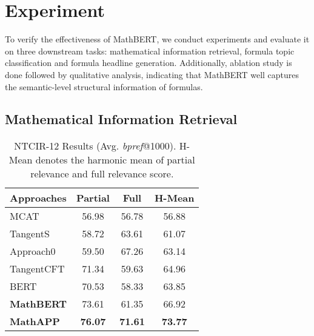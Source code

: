 \documentclass{article}
\begin{document}
\section{Experiment}

To verify the effectiveness of MathBERT, we conduct experiments and evaluate it on three downstream tasks: mathematical information retrieval, formula topic classification and formula headline generation. Additionally, ablation study is done followed by qualitative analysis, indicating that MathBERT well captures the semantic-level structural information of formulas.

\subsection{Mathematical Information Retrieval}\label{subsection:MIR}

\begin{table}[!h]
\vskip -0.05in
\centering
\begin{tabular}{lccc}
\toprule
Approaches         & Partial & Full & H-Mean \\
\hline
MCAT         & 56.98             & 56.78         & 56.88        \\
TangentS     & 58.72             & 63.61         & 61.07        \\
Approach0    & 59.50             & 67.26         & 63.14        \\
TangentCFT   & 71.34             & 59.63         & 64.96        \\
\hline
BERT         & 70.53             &	58.33         & 63.85        \\
\textbf{MathBERT}           & 73.61             & 61.35         & 66.92   
\\
\textbf{MathAPP} & \textbf{76.07}             & \textbf{71.61}         & \textbf{73.77}  
  \\
\bottomrule
\end{tabular}
\vskip -0.05in
\caption{NTCIR-12 Results (Avg. \textit{bpref}@1000). H-Mean denotes the harmonic mean of partial relevance and full relevance score.}
\label{tab:MathIR}
\vskip -0.1in
\end{table}
\end{document}

